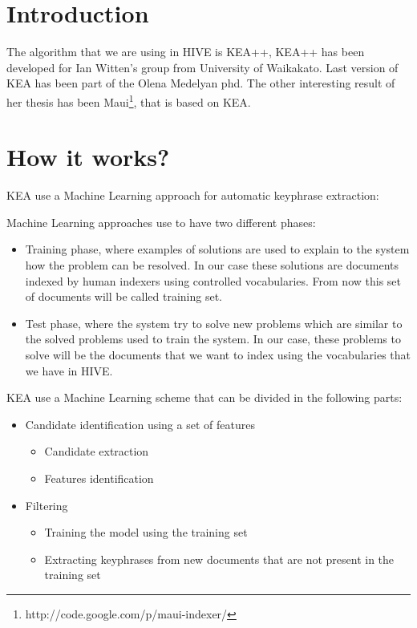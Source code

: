 \section{Introduction}

The algorithm that we are using in HIVE is KEA++, KEA++ has been
developed for Ian Witten's group from University of Waikakato. Last
version of KEA has been part of the Olena Medelyan phd. The other
interesting result of her thesis has been Maui\footnote{http://code.google.com/p/maui-indexer/}, that is based on KEA.


\section{How it works?}

KEA use a Machine Learning approach for automatic keyphrase extraction:

Machine Learning approaches use to have two different phases:
\begin{itemize}
 \item Training phase, where examples of solutions are used to explain to
the system how the problem can be resolved. In our case these
solutions are documents indexed by human indexers using controlled
vocabularies. From now this set of documents will be called training
set.
 \item Test phase, where the system try to solve new problems which are
similar to the solved problems used to train the system. In our case,
these problems to solve will be the documents that we want to index
using the vocabularies that we have in HIVE.
\end{itemize}

KEA use a Machine Learning scheme that can be divided in the following parts:
\begin{itemize}
 \item Candidate identification using a set of features
\begin{itemize}
\item Candidate extraction
\item Features identification
\end{itemize}
\item Filtering
\begin{itemize}
\item Training the model using the training set
\item Extracting keyphrases from new documents that are not present in the training set
\end{itemize}
\end{itemize}

